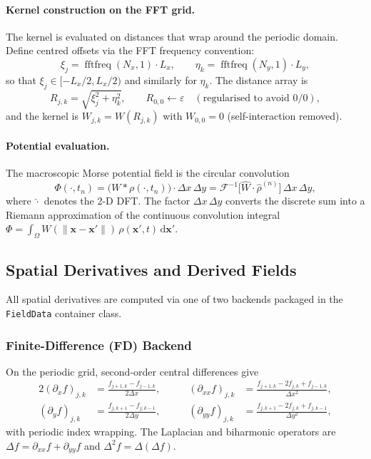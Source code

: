 \documentclass[11pt, letterpaper]{article}
\theoremstyle{definition}
\newcommand{\vx}{\mathbf{x}}
\newcommand{\dd}{\mathrm{d}}
\newcommand{\lap}{\Delta}
\newcommand{\bilap}{\Delta^{2}}
\DeclareMathOperator{\fftfreq}{fftfreq}
\begin{document}
\paragraph{Kernel construction on the FFT grid.}
The kernel is evaluated on distances that wrap around the periodic
domain.  Define centred offsets via the FFT frequency convention:
\begin{equation}
  \xi_j = \fftfreq(N_x, 1) \cdot L_x, \qquad
  \eta_k = \fftfreq(N_y, 1) \cdot L_y,
\end{equation}
so that $\xi_j \in [-L_x/2, L_x/2)$ and similarly for $\eta_k$.
The distance array is
\begin{equation}
  R_{j,k} = \sqrt{\xi_j^{2} + \eta_k^{2}}, \qquad
  R_{0,0} \leftarrow \varepsilon \quad (\text{regularised to avoid } 0/0),
\end{equation}
and the kernel is $W_{j,k} = W(R_{j,k})$ with $W_{0,0} = 0$
(self-interaction removed).

\paragraph{Potential evaluation.}
The macroscopic Morse potential field is the circular convolution
\begin{equation}
\label{eq:morse-potential}
  \Phi(\cdot, t_n)
  = \bigl(W * \rho(\cdot, t_n)\bigr) \cdot \Delta x \, \Delta y
  = \mathcal{F}^{-1}\!\bigl[\hat{W} \cdot \hat{\rho}^{(n)}\bigr]
    \,\Delta x \,\Delta y,
\end{equation}
where $\hat{\cdot}$ denotes the 2-D DFT.  The factor
$\Delta x\,\Delta y$ converts the discrete sum into a Riemann
approximation of the continuous convolution integral
$\Phi = \int_{\Omega} W(\lVert \vx - \vx'\rVert)\,\rho(\vx',t)\,\dd\vx'$.

\subsection{Spatial Derivatives and Derived Fields}
\label{sec:derivatives}

All spatial derivatives are computed via one of two backends packaged
in the \texttt{FieldData} container class.

\subsubsection{Finite-Difference (FD) Backend}
On the periodic grid, second-order central differences give
\begin{alignat}{2}
  (\partial_x f)_{j,k}
    &= \frac{f_{j+1,k} - f_{j-1,k}}{2\Delta x},
  &\qquad
  (\partial_{xx} f)_{j,k}
    &= \frac{f_{j+1,k} - 2f_{j,k} + f_{j-1,k}}{\Delta x^{2}},
  \\[4pt]
  (\partial_y f)_{j,k}
    &= \frac{f_{j,k+1} - f_{j,k-1}}{2\Delta y},
  &\qquad
  (\partial_{yy} f)_{j,k}
    &= \frac{f_{j,k+1} - 2f_{j,k} + f_{j,k-1}}{\Delta y^{2}},
\end{alignat}
with periodic index wrapping.  The Laplacian and biharmonic operators
are $\lap f = \partial_{xx}f + \partial_{yy}f$ and
$\bilap f = \lap(\lap f)$.
\end{document}
